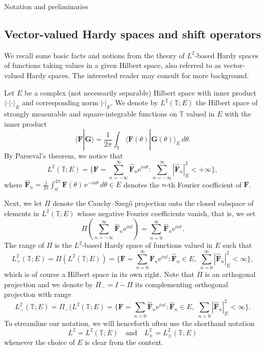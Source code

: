 \documentclass[10pt,reqno,a4paper]{amsart}
\makeatletter
\theoremstyle{definition}
\theoremstyle{remark}
\theoremstyle{remark}
\numberwithin{equation}{section}
\newcommand{\T}{\mathbb{T}}
\newcommand{\eu}{\mathrm{e}}
\newcommand{\Fb}{\mathbf{F}}
\newcommand{\Gb}{\mathbf{G}}
\newcommand{\id}{I}
\def\section{\@startsection{section}{1}%
  \z@{1.5\linespacing\@plus\linespacing}{.5\linespacing}%
  {\normalfont\bfseries\large\centering}}
\makeatother
\begin{document}
\section{Notation and preliminaries}

\label{sec:prelim}

\subsection{Vector-valued Hardy spaces and shift operators}

We recall some basic facts and notions from the theory of $L^2$-based Hardy spaces of functions taking values in a given Hilbert space, also referred to as vector-valued Hardy spaces. The interested reader may consult \cite{SzFoBeKe-10, Pe-03} for more background.

Let $E$ be a complex (not necessarily separable) Hilbert space with inner product $\langle \cdot | \cdot \rangle_E$ and corresponding norm $|\cdot |_E$.  We denote by $L^2(\T; E)$ the Hilbert space of strongly measurable and square-integrable functions on $\T$ valued in $E$ with the inner product 
$$
\langle \Fb | \Gb \rangle = \frac{1}{2 \pi} \int_\T \langle \Fb(\theta) | \Gb(\theta) \rangle_E \, d \theta .
$$
By Parseval's theorem, we notice that
$$
 L^2(\T; E) = \big \{ \Fb = \sum_{n=-\infty}^\infty \widehat{\Fb}_n \eu^{in \theta} : \sum_{n=-\infty}^\infty |\widehat{\Fb}_n|_E^2 < +\infty \big \},
$$
where $\widehat{\Fb}_n = \frac{1}{2 \pi} \int_0^{2\pi} \Fb(\theta) \, \eu^{-in \theta} \, d\theta \in E$ denotes the $n$-th Fourier coefficient of $\Fb$. 

Next, we let $\Pi$ denote the Cauchy--Szeg\H{o} projection onto the closed subspace of elements in $L^2(\T; E)$ whose negative Fourier coefficients vanish, that is, we set
$$
\Pi \left ( \sum_{n=-\infty}^\infty \widehat{\Fb}_n \eu^{int} \right ) = \sum_{n=0}^\infty \widehat{\Fb}_n \eu^{int}.
$$
The range of $\Pi$ is the $L^2$-based Hardy space of functions valued in $E$ such that 
$$
L^2_+(\T;E) = \Pi(L^2(\T;E)) = \big \{ \Fb =\sum_{n=0}^\infty \widehat{\Fb}_n \eu^{int} : \widehat{\Fb}_n \in E, \; \sum_{n=0}^\infty |\widehat{\Fb}_n|^2_E < \infty  \big \},
$$
which is of course a Hilbert space in its own right. Note that $\Pi$ is an orthogonal projection and we denote by $\Pi_- =  \id - \Pi$ its complementing orthogonal projection with range
$$
L^2_-(\T; E) = \Pi_-(L^2(\T;E) = \big \{ \Fb =\sum_{n <0} \widehat{\Fb}_n \eu^{int} :  \widehat{\Fb}_n \in E, \; \sum_{n <0} |\widehat{\Fb}_n|^2_E < \infty \big  \}.
$$ 
To streamline our notation, we will henceforth often use the shorthand notation
$$
L^2 = L^2(\T; E) \quad \mbox{and} \quad L_{\pm}^2 = L_{\pm}^2(\T; E) 
$$ 
whenever the choice of $E$ is clear from the context. 
\end{document}
